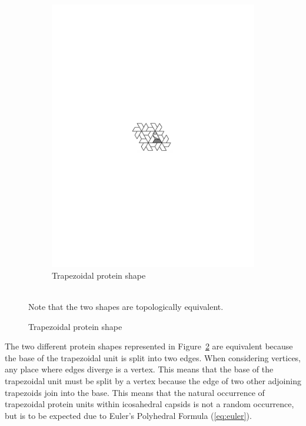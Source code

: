\documentclass[12pt,letter]{article}
\begin{document}
\begin{figure}[h]
\begin{subfigure}[h]{0.35\textwidth}
		\includegraphics[width = \textwidth]{tile_trap.pdf}
		\caption{Trapezoidal protein shape}
		\label{fig:tile_trap}
	\end{subfigure} \\
	Note that the two shapes are topologically equivalent.
	\label{fig:tiles}
\end{figure}

The two different protein shapes represented in Figure~\ref{fig:tiles} are equivalent because the base of the trapezoidal unit is split into two edges. When considering vertices, any place where edges diverge is a vertex. This means that the base of the trapezoidal unit must be split by a vertex because the edge of two other adjoining trapezoids join into the base. This means that the natural occurrence of trapezoidal protein units within icosahedral capsids is not a random occurrence, but is to be expected due to Euler's Polyhedral Formula (\ref{eq:euler}).
\end{document}
